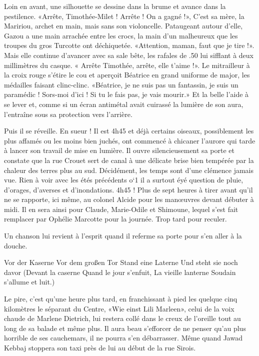 Loin en avant, une silhouette se dessine dans la brume et avance dans la pestilence. «Arrête, Timothée-Milet ! Arrête ! On a gagné !», C’est sa mère, la Maririou, archet en main, mais sans son violoncelle. Pataugeant autour d’elle, Gazou a une main arrachée entre les crocs, la main d’un malheureux que les troupes du gros Turcotte ont déchiquetée. «Attention, maman, faut que je tire !». Mais elle continue d’avancer avec sa sale bête, les rafales de .50 lui sifflant à deux millimètres du casque. « Arrête Timothée, arrête, elle t’aime !». Le mitrailleur à la croix rouge s’étire le cou et aperçoit Béatrice en grand uniforme de major, les médailles faisant clinc-clinc. «Béatrice, je ne suis pas un fantassin, je suis un paramédic ! Sors-moi d’ici ! Si tu le fais pas, je vais mourir.» Et la belle l’aide à se lever et, comme si un écran antimétal avait cuirassé la lumière de son aura, l’entraîne sous sa protection vers l’arrière.

Puis il se réveille. En sueur ! Il est 4h45 et déjà certains oiseaux, possiblement les plus affamés ou les moins bien juchés, ont commencé à chicaner l’aurore qui tarde à lancer son travail de mise en lumière. Il ouvre silencieusement sa porte et constate que la rue Crouet sert de canal à une délicate brise bien tempérée par la chaleur des terres plus au sud. Décidément, les temps sont d’une clémence jamais vue. Rien à voir avec les étés précédents o`1 il a surtout éyé question de pluie, d’orages, d’averses et d’inondations. 4h45 ! Plus de sept heures à tirer avant qu’il ne se rapporte, ici même, au colonel Alcide pour les manœuvres devant débuter à midi. Il en sera ainsi pour Claude, Marie-Odile et Shimoune, lequel s’est fait remplacer par Ophélie Marcotte pour la journée. Trop tard pour reculer.

Un chanson lui revient à l’esprit quand il referme sa porte pour s’en aller à la douche.

    Vor der Kaserne
    Vor dem großen Tor
    Stand eine Laterne
    Und steht sie noch davor
    (Devant la caserne
    Quand le jour s’enfuit,
    La vieille lanterne
    Soudain s’allume et luit.)

Le pire, c’est qu’une heure plus tard, en franchissant à pied les quelque cinq kilomètres le séparant du Centre, «Wie einst Lili Marleen», celui de la voix chaude de Marlene Dietrich, lui restera collé dans le creux de l’oreille tout au long de sa balade et même plus. Il aura beau s’efforcer de ne penser qu’au plus horrible de ses cauchemars, il ne pourra s’en débarrasser. Même quand Jawad Kebbaj stoppera son taxi près de lui au début de la rue Sirois.

